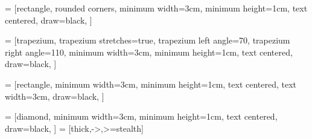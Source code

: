 \newcommand{\MExpect}{\mathsf{M}}

\DeclareMathOperator{\sgn}{\mathop{sgn}}

\newcommand*{\hm}[1]{#1\nobreak\discretionary{} {\hbox{$\mathsurround=0pt #1$}}{}}


\usetikzlibrary{shapes.geometric, arrows}

 = [rectangle, rounded corners, 
minimum width=3cm, 
minimum height=1cm,
text centered, 
draw=black, 
]

 = [trapezium, 
trapezium stretches=true, %
trapezium left angle=70, 
trapezium right angle=110, 
minimum width=3cm, 
minimum height=1cm, text centered, 
draw=black,
]

 = [rectangle, 
minimum width=3cm, 
minimum height=1cm, 
text centered, 
text width=3cm, 
draw=black, 
]

 = [diamond, 
minimum width=3cm, 
minimum height=1cm, 
text centered, 
draw=black, 
]
 = [thick,->,>=stealth]


\captionsetup[code]{position=top}

